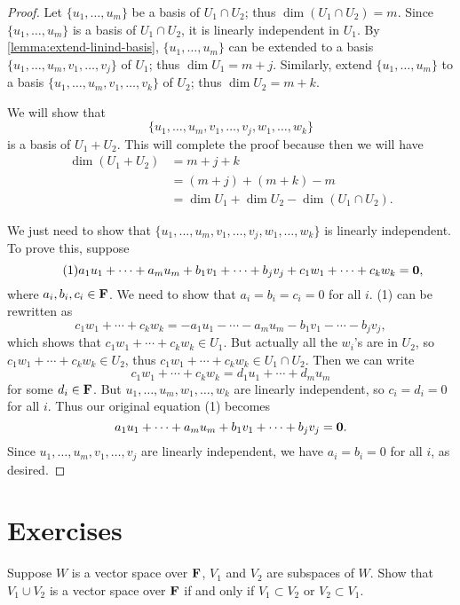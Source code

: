 \begin{proof}
Let $\{u_1,\dots,u_m\}$ be a basis of $U_1\cap U_2$; thus $\dim(U_1\cap U_2)=m$. Since $\{u_1,\dots,u_m\}$ is a basis of $U_1\cap U_2$, it is linearly independent in $U_1$. By \cref{lemma:extend-linind-basis}, $\{u_1,\dots,u_m\}$ can be extended to a basis $\{u_1,\dots,u_m,v_1,\dots,v_j\}$ of $U_1$; thus $\dim U_1=m+j$. Similarly, extend $\{u_1,\dots,u_m\}$ to a basis $\{u_1,\dots,u_m,v_1,\dots,v_k\}$ of $U_2$; thus $\dim U_2=m+k$.

We will show that
\[\{u_1,\dots,u_m,v_1,\dots,v_j,w_1,\dots,w_k\}\]
is a basis of $U_1+U_2$. This will complete the proof because then we will have
\begin{align*}
\dim(U_1+U_2)&=m+j+k\\
&=(m+j)+(m+k)-m\\
&=\dim U_1+\dim U_2-\dim(U_1\cap U_2).
\end{align*}

We just need to show that $\{u_1,\dots,u_m,v_1,\dots,v_j,w_1,\dots,w_k\}$ is linearly independent. To prove this, suppose
\begin{equation*}\tag{1}
a_1u_1+\cdots+a_mu_m+b_1v_1+\cdots+b_jv_j+c_1w_1+\cdots+c_kw_k=\vb{0},
\end{equation*}
where $a_i,b_i,c_i\in\mathbf F$. We need to show that $a_i=b_i=c_i=0$ for all $i$. (1) can be rewritten as
\[c_1w_1+\cdots+c_kw_k=-a_1u_1-\cdots-a_mu_m-b_1v_1-\cdots-b_jv_j,\]
which shows that $c_1w_1+\cdots+c_kw_k\in U_1$. But actually all the $w_i$'s are in $U_2$, so $c_1w_1+\cdots+c_kw_k\in U_2$, thus $c_1w_1+\cdots+c_kw_k\in U_1\cap U_2$. Then we can write
\[c_1w_1+\cdots+c_kw_k=d_1u_1+\cdots+d_mu_m\]
for some $d_i\in\mathbf F$. But $u_1,\dots,u_m,w_1,\dots,w_k$ are linearly independent, so $c_i=d_i=0$ for all $i$. Thus our original equation (1) becomes
\[a_1u_1+\cdots+a_mu_m+b_1v_1+\cdots+b_jv_j=\vb{0}.\]
Since $u_1,\dots,u_m,v_1,\dots,v_j$ are linearly independent, we have $a_i=b_i=0$ for all $i$, as desired.
\end{proof}
\pagebreak

\section*{Exercises}
\begin{exercise}
Suppose $W$ is a vector space over $\mathbf F$, $V_1$ and $V_2$ are subspaces of $W$. Show that $V_1\cup V_2$ is a vector space over $\mathbf F$ if and only if $V_1\subset V_2$ or $V_2\subset V_1$.
\end{exercise}


